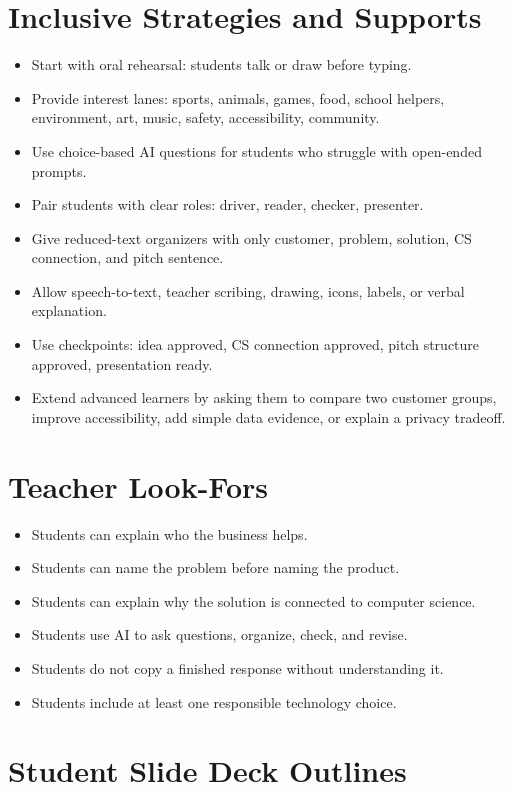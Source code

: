 \documentclass[11pt]{article}
\begin{document}
\section{Inclusive Strategies and Supports}
\begin{itemize}
  \item Start with oral rehearsal: students talk or draw before typing.
  \item Provide interest lanes: sports, animals, games, food, school helpers, environment, art, music, safety, accessibility, community.
  \item Use choice-based AI questions for students who struggle with open-ended prompts.
  \item Pair students with clear roles: driver, reader, checker, presenter.
  \item Give reduced-text organizers with only customer, problem, solution, CS connection, and pitch sentence.
  \item Allow speech-to-text, teacher scribing, drawing, icons, labels, or verbal explanation.
  \item Use checkpoints: idea approved, CS connection approved, pitch structure approved, presentation ready.
  \item Extend advanced learners by asking them to compare two customer groups, improve accessibility, add simple data evidence, or explain a privacy tradeoff.
\end{itemize}

\section{Teacher Look-Fors}
\begin{itemize}
  \item Students can explain who the business helps.
  \item Students can name the problem before naming the product.
  \item Students can explain why the solution is connected to computer science.
  \item Students use AI to ask questions, organize, check, and revise.
  \item Students do not copy a finished response without understanding it.
  \item Students include at least one responsible technology choice.
\end{itemize}

\section{Student Slide Deck Outlines}
\end{document}
